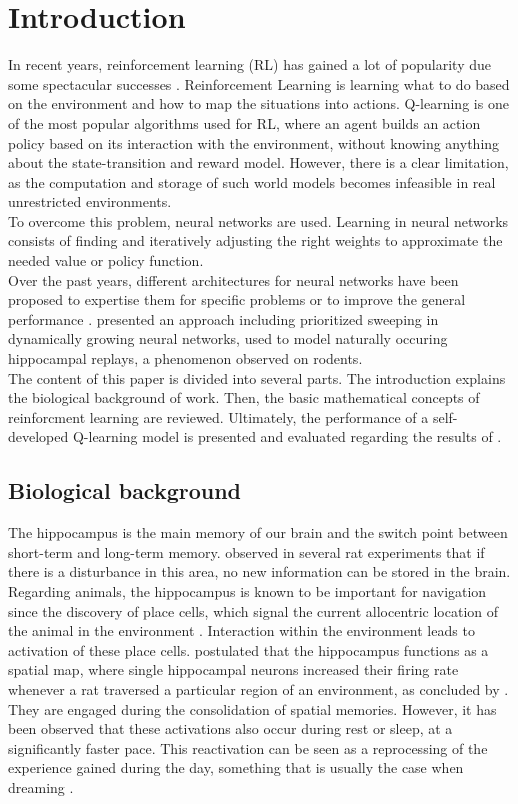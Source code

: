 \documentclass[a4paper]{article}
\begin{document}
	\section{Introduction}
	In recent years, reinforcement learning (RL) has gained a lot of popularity due some spectacular successes \citep{Atari} . Reinforcement Learning is learning what to do based on the environment and how to map the situations into actions. Q-learning is one of the most popular algorithms used for RL, where an agent builds an action policy based on its interaction with the environment, without knowing anything about the state-transition and reward model. However, there is a clear limitation, as the computation and storage of such world models becomes infeasible in real unrestricted environments. \\
	To overcome this problem, neural networks are used. Learning in neural networks consists of finding and iteratively adjusting the right weights to approximate the needed value or policy function. \\
	Over the past years, different architectures for neural networks have been proposed to expertise them for specific problems or to improve the general performance \citep{James2018}. \citet{NeuralDynaQ} presented an approach including prioritized sweeping in dynamically growing neural networks, used to model naturally occuring hippocampal replays, a phenomenon observed on rodents. \\
	The content of this paper is divided into several parts. The introduction explains the biological background of \citet{NeuralDynaQ} work. Then, the basic mathematical concepts of reinforcment learning are reviewed. Ultimately, the performance of a self-developed Q-learning model is presented and evaluated regarding the results of \citet{NeuralDynaQ}.
	\subsection{Biological background}
	\label{sec:introduction}
	\par The hippocampus is the main memory of our brain and the switch point between short-term and long-term memory. \citet{OKEEFE1971171} observed in several rat experiments that if there is a disturbance in this area, no new information can be stored in the brain. Regarding animals, the hippocampus is known to be important for navigation since the discovery of place cells, which signal the current allocentric location of the animal in the environment \citep{Maguire}. Interaction within the environment leads to activation of these place cells. \cite{OKEEFE1971171} postulated that the hippocampus functions as a spatial map, where single hippocampal neurons increased their firing rate whenever a rat traversed a particular region of an environment, as concluded by \cite{Nakazawa}. They are engaged during the consolidation of spatial memories. However, it has been observed that these activations also occur during rest or sleep, at a significantly faster pace. This reactivation can be seen as a reprocessing of the experience gained during the day, something that is usually the case when dreaming \citep{HippocampalReplaysGirard}.
	
\end{document}
